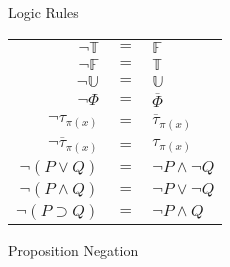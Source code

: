 \documentclass{article}
\newcommand{\Tprop}{\mathbb{T}}
\newcommand{\Fprop}{\mathbb{F}}
\newcommand{\Uprop}{\mathbb{U}}
\newcommand{\Ntype}{\mathbf{N}}
\newcommand{\NOT}{\overline}
\newcommand{\deptype}[1]{\{ \diamond : \Ntype \: | \: #1 \}}
\begin{document}
\begin{figure}
\caption{Logic Rules}

\end{figure}


\begin{figure}
\begin{tabular}{r  c  l }

$ \neg \Tprop $ & $ = $ & $ \Fprop $ \\
$ \neg \Fprop $ & $ = $ & $ \Tprop $ \\
$ \neg \Uprop $ & $ = $ & $ \Uprop $ \\
$ \neg \Phi $ & $ = $ & $ \NOT \Phi $ \\
$ \neg \tau_{\pi(x)}$ & $ = $ & $\NOT{\tau}_{\pi(x)} $ \\ 
$ \neg \NOT\tau_{\pi(x)}$ & $ = $ & ${\tau}_{\pi(x)} $ \\ 
$ \neg (P \vee Q) $ & $ = $ & $ \neg P \wedge \neg Q $ \\
$ \neg (P \wedge Q) $ & $ = $ & $ \neg P \vee \neg Q $ \\
$ \neg (P \supset Q) $ & $ = $ & $ \neg P \wedge Q $ 


\end{tabular}

\caption{Proposition Negation}

\end{figure}
\end{document}
